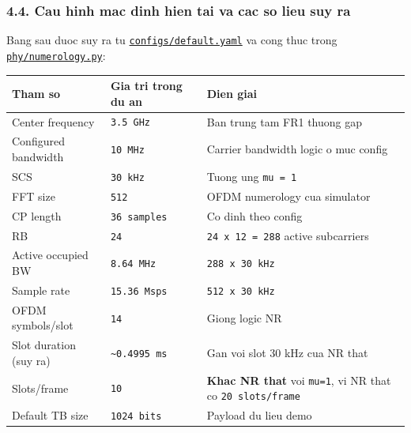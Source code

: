 \documentclass[
  vietnamese,
  a4paper,
  11pt]{article}
\newcounter{none} %
\begin{document}
\subsubsection{4.4. Cau hinh mac dinh hien tai va cac so lieu suy
ra}\label{cau-hinh-mac-dinh-hien-tai-va-cac-so-lieu-suy-ra}

Bang sau duoc suy ra tu
\href{../configs/default.yaml}{\texttt{configs/default.yaml}} va cong
thuc trong \href{../phy/numerology.py}{\texttt{phy/numerology.py}}:

{\def\LTcaptype{none} %
\begin{longtable}[]{@{}
  >{\raggedright\arraybackslash}p{}
  >{\raggedleft\arraybackslash}p{}
  >{\raggedright\arraybackslash}p{}@{}}
\toprule\noalign{}
\begin{minipage}[b]{\linewidth}\raggedright
Tham so
\end{minipage} & \begin{minipage}[b]{\linewidth}\raggedleft
Gia tri trong du an
\end{minipage} & \begin{minipage}[b]{\linewidth}\raggedright
Dien giai
\end{minipage} \\
\midrule\noalign{}
\endhead
\bottomrule\noalign{}
\endlastfoot
Center frequency & \texttt{3.5\ GHz} & Ban trung tam FR1 thuong gap \\
Configured bandwidth & \texttt{10\ MHz} & Carrier bandwidth logic o muc
config \\
SCS & \texttt{30\ kHz} & Tuong ung \texttt{mu\ =\ 1} \\
FFT size & \texttt{512} & OFDM numerology cua simulator \\
CP length & \texttt{36\ samples} & Co dinh theo config \\
RB & \texttt{24} & \texttt{24\ x\ 12\ =\ 288} active subcarriers \\
Active occupied BW & \texttt{8.64\ MHz} & \texttt{288\ x\ 30\ kHz} \\
Sample rate & \texttt{15.36\ Msps} & \texttt{512\ x\ 30\ kHz} \\
OFDM symbols/slot & \texttt{14} & Giong logic NR \\
Slot duration (suy ra) & \texttt{\textasciitilde{}0.4995\ ms} & Gan voi
slot 30 kHz cua NR that \\
Slots/frame & \texttt{10} & \textbf{Khac NR that} voi \texttt{mu=1}, vi
NR that co \texttt{20\ slots/frame} \\
Default TB size & \texttt{1024\ bits} & Payload du lieu demo \\
\end{longtable}
}
\end{document}
